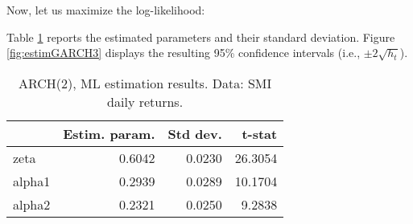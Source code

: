 \documentclass[
  12pt,
]{book}
\newenvironment{Shaded}{\begin{snugshade}}{\end{snugshade}}
\newcommand{\AttributeTok}[1]{\textcolor[rgb]{0.77,0.63,0.00}{#1}}
\newcommand{\CommentTok}[1]{\textcolor[rgb]{0.56,0.35,0.01}{\textit{#1}}}
\newcommand{\ConstantTok}[1]{\textcolor[rgb]{0.00,0.00,0.00}{#1}}
\newcommand{\DecValTok}[1]{\textcolor[rgb]{0.00,0.00,0.81}{#1}}
\newcommand{\FloatTok}[1]{\textcolor[rgb]{0.00,0.00,0.81}{#1}}
\newcommand{\FunctionTok}[1]{\textcolor[rgb]{0.00,0.00,0.00}{#1}}
\newcommand{\NormalTok}[1]{#1}
\newcommand{\OtherTok}[1]{\textcolor[rgb]{0.56,0.35,0.01}{#1}}
\newcommand{\SpecialCharTok}[1]{\textcolor[rgb]{0.00,0.00,0.00}{#1}}
\newcommand{\StringTok}[1]{\textcolor[rgb]{0.31,0.60,0.02}{#1}}
\theoremstyle{definition}
\theoremstyle{definition}
\theoremstyle{definition}
\theoremstyle{definition}
\theoremstyle{remark}
\begin{document}
Now, let us maximize the log-likelihood:

\begin{Shaded}
\end{Shaded}

Table \ref{tab:estimGARCH2} reports the estimated parameters and their standard deviation. Figure \ref{fig:estimGARCH3} displays the resulting 95\% confidence intervals (i.e., \(\pm 2 \sqrt{h_t}\)).

\begin{table}

\caption{\label{tab:estimGARCH2}ARCH(2), ML estimation results.
             Data: SMI daily returns.}
\centering
\begin{tabular}[t]{l|r|r|r}
\hline
  & Estim. param. & Std dev. & t-stat\\
\hline
zeta & 0.6042 & 0.0230 & 26.3054\\
\hline
alpha1 & 0.2939 & 0.0289 & 10.1704\\
\hline
alpha2 & 0.2321 & 0.0250 & 9.2838\\
\hline
\end{tabular}
\end{table}
\end{document}
